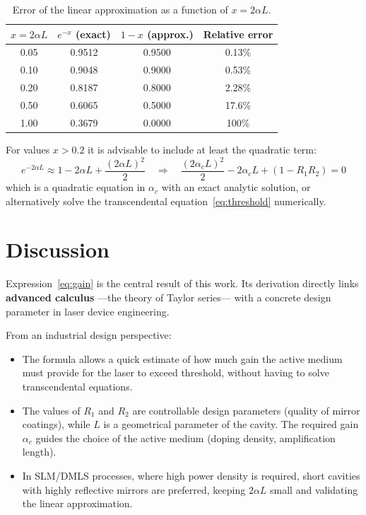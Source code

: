 \documentclass[12pt, a4paper]{article}
\begin{document}
\begin{table}[H]
  \centering
  \caption{Error of the linear approximation as a function of $x = 2\alpha L$.}
  \label{tab:error}
  \begin{tabular}{cccc}
    \toprule
    $x = 2\alpha L$ & $e^{-x}$ (exact) & $1 - x$ (approx.) & Relative error \\
    \midrule
    0.05 & 0.9512 & 0.9500 & 0.13\% \\
    0.10 & 0.9048 & 0.9000 & 0.53\% \\
    0.20 & 0.8187 & 0.8000 & 2.28\% \\
    0.50 & 0.6065 & 0.5000 & 17.6\% \\
    1.00 & 0.3679 & 0.0000 & 100\%    \\
    \bottomrule
  \end{tabular}
\end{table}

For values $x > 0.2$ it is advisable to include at least the quadratic term:
%
\begin{equation}
  e^{-2\alpha L} \approx 1 - 2\alpha L + \frac{(2\alpha L)^2}{2}
  \quad \Longrightarrow \quad
  \frac{(2\alpha_c L)^2}{2} - 2\alpha_c L + (1 - R_1 R_2) = 0
\end{equation}
%
which is a quadratic equation in $\alpha_c$ with an exact analytic solution, or alternatively
solve the transcendental equation~\eqref{eq:threshold} numerically.

\section{Discussion}

Expression~\eqref{eq:gain} is the central result of this work. Its derivation directly
links \textbf{advanced calculus} —the theory of Taylor series— with a concrete design
parameter in laser device engineering.

From an industrial design perspective:

\begin{itemize}[leftmargin=2em]
  \item The formula allows a quick estimate of how much gain the active medium must provide
        for the laser to exceed threshold, without having to solve transcendental equations.
  \item The values of $R_1$ and $R_2$ are controllable design parameters (quality of mirror
        coatings), while $L$ is a geometrical parameter of the cavity. The required gain
        $\alpha_c$ guides the choice of the active medium (doping density, amplification length).
  \item In SLM/DMLS processes, where high power density is required, short cavities with
        highly reflective mirrors are preferred, keeping $2\alpha L$ small and validating
        the linear approximation.
\end{itemize}
\end{document}
